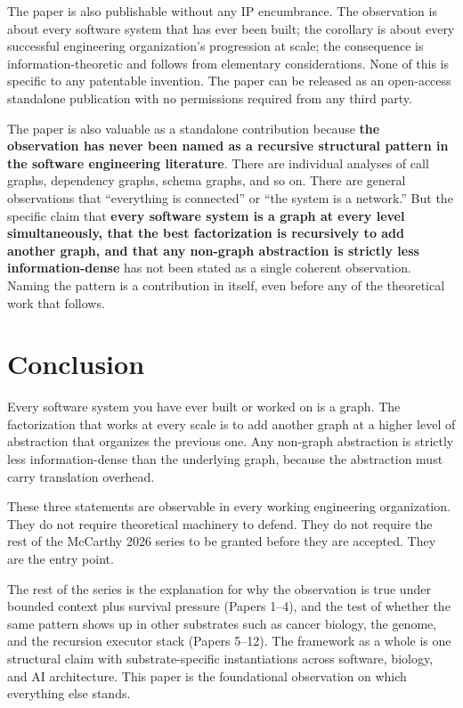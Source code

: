 \documentclass[11pt]{article}
\begin{document}
The paper is also publishable without any IP encumbrance. The observation is about every software system that has ever been built; the corollary is about every successful engineering organization's progression at scale; the consequence is information-theoretic and follows from elementary considerations. None of this is specific to any patentable invention. The paper can be released as an open-access standalone publication with no permissions required from any third party.

The paper is also valuable as a standalone contribution because \textbf{the observation has never been named as a recursive structural pattern in the software engineering literature}. There are individual analyses of call graphs, dependency graphs, schema graphs, and so on. There are general observations that ``everything is connected'' or ``the system is a network.'' But the specific claim that \textbf{every software system is a graph at every level simultaneously, that the best factorization is recursively to add another graph, and that any non-graph abstraction is strictly less information-dense} has not been stated as a single coherent observation. Naming the pattern is a contribution in itself, even before any of the theoretical work that follows.

\section{Conclusion}
\label{sec:conclusion}

Every software system you have ever built or worked on is a graph. The factorization that works at every scale is to add another graph at a higher level of abstraction that organizes the previous one. Any non-graph abstraction is strictly less information-dense than the underlying graph, because the abstraction must carry translation overhead.

These three statements are observable in every working engineering organization. They do not require theoretical machinery to defend. They do not require the rest of the McCarthy 2026 series to be granted before they are accepted. They are the entry point.

The rest of the series is the explanation for why the observation is true under bounded context plus survival pressure (Papers 1--4), and the test of whether the same pattern shows up in other substrates such as cancer biology, the genome, and the recursion executor stack (Papers 5--12). The framework as a whole is one structural claim with substrate-specific instantiations across software, biology, and AI architecture. This paper is the foundational observation on which everything else stands.
\end{document}
